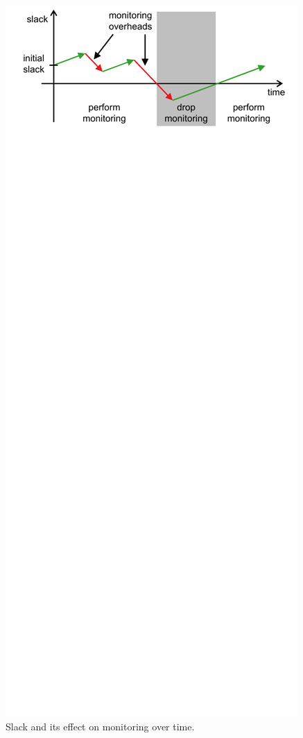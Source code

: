 \begin{figure} \begin{center}
\includegraphics[width=\columnwidth]{figs/slack.pdf} \vspace{-0.2in}
\caption{Slack and its effect on monitoring over time.}
\label{fig:policies.slack} \vspace{-0.1in} \end{center} \end{figure}

